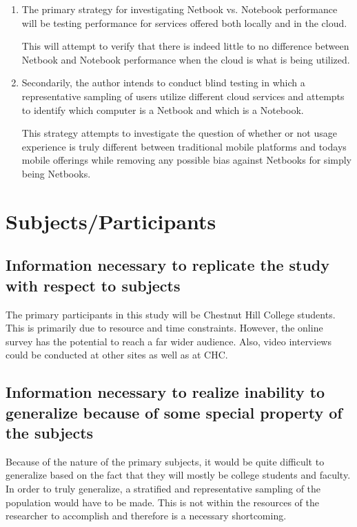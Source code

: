 \documentclass[12pt,oneside,letterpaper]{article}
\begin{document}
\begin{enumerate}

\item The primary strategy for investigating Netbook vs. Notebook performance
  will be testing performance for services offered both locally and in the
  cloud.

  This will attempt to verify that there is indeed little to no difference
  between Netbook and Notebook performance when the cloud is what is being
  utilized.

\item Secondarily, the author intends to conduct blind testing in which a
  representative sampling of users utilize different cloud services and attempts
  to identify which computer is a Netbook and which is a Notebook.

  This strategy attempts to investigate the question of whether or not usage
  experience is truly different between traditional mobile platforms and todays
  mobile offerings while removing any possible bias against Netbooks for simply
  being Netbooks.

\end{enumerate}

\section{Subjects/Participants}

\subsection{Information necessary to replicate the study with respect to subjects}

The primary participants in this study will be Chestnut Hill College students.
This is primarily due to resource and time constraints.  However, the online
survey has the potential to reach a far wider audience.  Also, video interviews
could be conducted at other sites as well as at CHC.

\subsection{Information necessary to realize inability to generalize because of some special property of the subjects}

Because of the nature of the primary subjects, it would be quite difficult to
generalize based on the fact that they will mostly be college students and
faculty.  In order to truly generalize, a stratified and representative sampling
of the population would have to be made.  This is not within the resources of
the researcher to accomplish and therefore is a necessary shortcoming.
\end{document}
